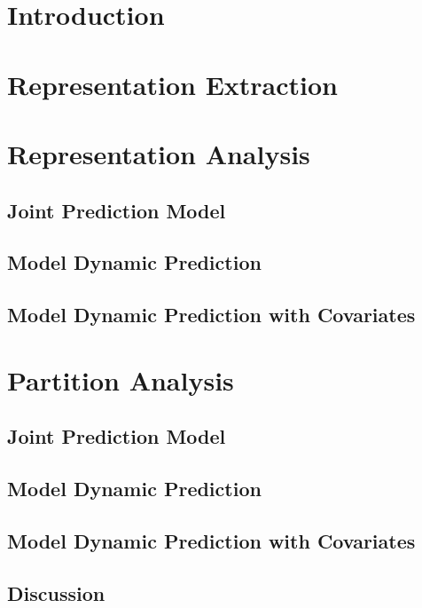 \section{Introduction}
\lorem

\section{Representation Extraction}
\lorem

\section{Representation Analysis}
\lorem

\subsection{Joint Prediction Model}
\lorem

\subsection{Model Dynamic Prediction}
\lorem

\subsection{Model Dynamic Prediction with Covariates}
\lorem

\section{Partition Analysis}
\lorem

\subsection{Joint Prediction Model}
\lorem

\subsection{Model Dynamic Prediction}
\lorem

\subsection{Model Dynamic Prediction with Covariates}
\lorem

\subsection{Discussion}
\lorem
